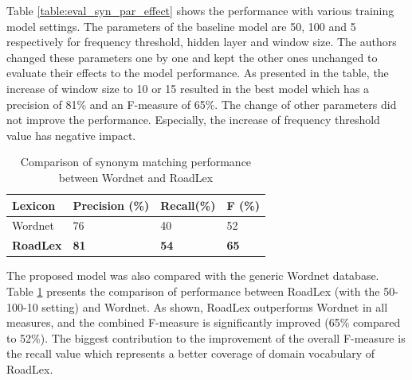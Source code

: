 \documentclass[Journal, BackFigs, DoubleSpace]{ascelike}%
\begin{document}
%
Table \ref{table:eval_syn_par_effect} shows the performance with various training model settings. The parameters of the baseline model are 50, 100 and 5 respectively for frequency threshold, hidden layer and window size. The authors changed these parameters one by one and kept the other ones unchanged to evaluate their effects to the model performance. As presented in the table, the increase of window size to 10 or 15 resulted in the best model which has a precision of 81\% and an F-measure of 65\%. The change of other parameters did not improve the performance. Especially, the increase of frequency threshold value has negative impact. 
%
\begin{table} [b] 
	\caption{Comparison of synonym matching performance between Wordnet and RoadLex}
	\label{table:eval_syn_vs_Wordnet}
	\centering
	\small
	\renewcommand{\arraystretch}{1.25}
	\begin{tabular}{l l l l }
		\hline
		\hline
		\textbf{Lexicon} & \textbf{Precision (\%)}  & \textbf{Recall(\%)} & \textbf{F (\%)}\\
		\hline
		Wordnet	&76 	&40 	&52\\	
		\textbf{RoadLex} &\textbf{81}	&\textbf{54}		&\textbf{65}\\	
		\hline
		\hline
	\end{tabular}
	\normalsize
\end{table}
\par
The proposed model was also compared with the generic Wordnet database. Table \ref{table:eval_syn_vs_Wordnet} presents the comparison of performance between RoadLex (with the 50-100-10 setting) and Wordnet. As shown, RoadLex outperforms Wordnet in all measures, and the combined F-measure is significantly improved (65\% compared to 52\%). The biggest contribution to the improvement of the overall F-measure is the recall value which represents a better coverage of domain vocabulary of RoadLex. 
\end{document}
